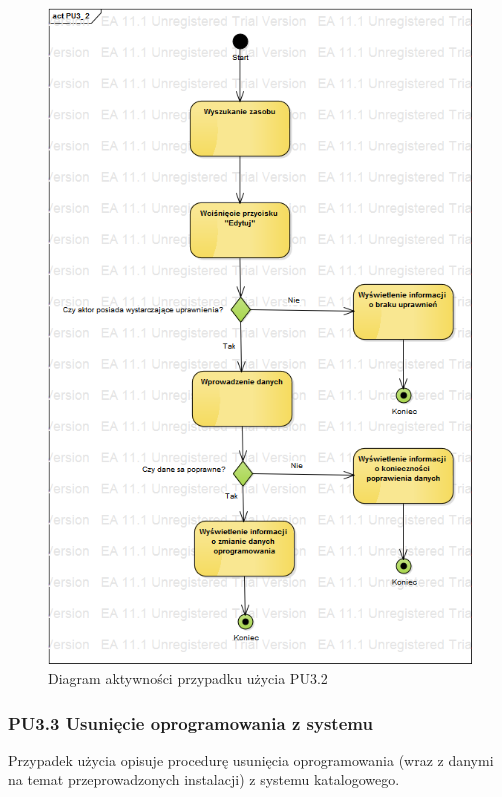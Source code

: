 \begin{figure}[h!]
	\centering
	\includegraphics[scale=0.6]{img/diagrams/activityDiagrams/PU3_2}
	\caption{Diagram aktywności przypadku użycia PU3.2 \label{fig:labelADPU3.2}}
\end{figure}

\subsubsection{PU3.3 Usunięcie oprogramowania z systemu}

Przypadek użycia opisuje procedurę usunięcia oprogramowania (wraz z danymi na temat przeprowadzonych instalacji) z systemu katalogowego.

